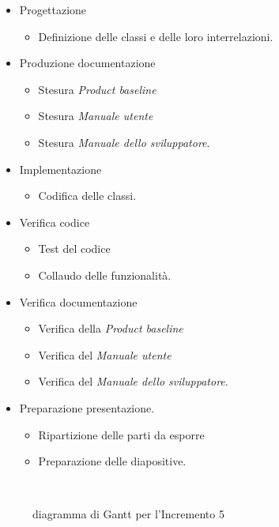 \documentclass[../piano-di-progetto.tex]{subfiles}
\begin{document}
\begin{itemize}
  \item Progettazione
  \begin{itemize}
    \item Definizione delle classi e delle loro interrelazioni.
  \end{itemize}
  \item Produzione documentazione
  \begin{itemize}
    \item Stesura \textit{Product baseline}
    \item Stesura \textit{Manuale utente}
    \item Stesura \textit{Manuale dello sviluppatore}.
  \end{itemize}
  \item Implementazione
  \begin{itemize}
    \item Codifica delle classi.
  \end{itemize}
  \item Verifica codice
  \begin{itemize}
    \item Test del codice
    \item Collaudo delle funzionalità.
  \end{itemize}
  \item Verifica documentazione
  \begin{itemize}
    \item Verifica della \textit{Product baseline}
    \item Verifica del \textit{Manuale utente}
    \item Verifica del \textit{Manuale dello sviluppatore}.
  \end{itemize}
  \item Preparazione presentazione.
  \begin{itemize}
    \item Ripartizione delle parti da esporre
    \item Preparazione delle diapositive.
  \end{itemize}
\end{itemize}
\begin{figure}[H]
  \centering
  
  \caption{diagramma di Gantt per l'Incremento 5}%
~~\label{fig:gantt_incremento_5}
\end{figure}
\end{document}
